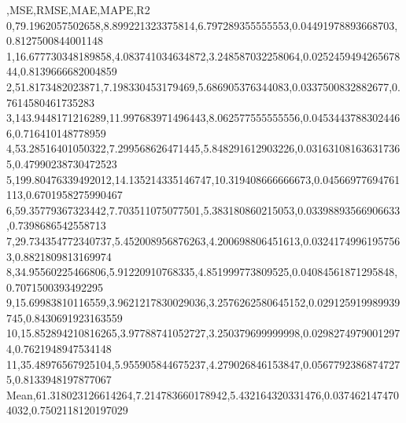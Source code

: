 ,MSE,RMSE,MAE,MAPE,R2
0,79.1962057502658,8.899221323375814,6.797289355555553,0.04491978893668703,0.8127500844001148
1,16.677730348189858,4.083741034634872,3.248587032258064,0.025245949426567844,0.8139666682004859
2,51.8173482023871,7.198330453179469,5.686905376344083,0.0337500832882677,0.7614580461735283
3,143.9448171216289,11.997683971496443,8.062577555555556,0.04534437883024466,0.716410148778959
4,53.28516401050322,7.299568626471445,5.848291612903226,0.031631081636317365,0.47990238730472523
5,199.80476339492012,14.135214335146747,10.319408666666673,0.04566977694761113,0.6701958275990467
6,59.35779367323442,7.703511075077501,5.383180860215053,0.03398893566906633,0.7398686542558713
7,29.734354772340737,5.452008956876263,4.200698806451613,0.03241749961957563,0.8821809813169974
8,34.95560225466806,5.91220910768335,4.851999773809525,0.04084561871295848,0.7071500393492295
9,15.69983810116559,3.9621217830029036,3.2576262580645152,0.029125919989939745,0.8430691923163559
10,15.852894210816265,3.97788741052727,3.250379699999998,0.02982749790012974,0.7621948947534148
11,35.48976567925104,5.955905844675237,4.279026846153847,0.05677923868747275,0.8133948197877067
Mean,61.318023126614264,7.214783660178942,5.432164320331476,0.0374621474704032,0.7502118120197029
